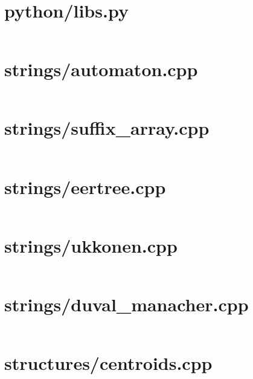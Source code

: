 \newpage
\section{python/libs.py}
\fontsize{7.9}{8.5}\selectfont
\inputminted[numbersep=1pt,linenos,breaklines]{python}{algo/python/libs.py}

\newpage
\section{strings/automaton.cpp}
\fontsize{7.9}{8.5}\selectfont
\inputminted[numbersep=1pt,linenos,breaklines]{c++}{/home/ifsmirnov/olymp/teambook/tmp.qSsNloJNks/tmp.F8erhIFJEZ}

\newpage
\section{strings/suffix\_array.cpp}
\fontsize{7.9}{8.5}\selectfont
\inputminted[numbersep=1pt,linenos,breaklines]{c++}{/home/ifsmirnov/olymp/teambook/tmp.qSsNloJNks/tmp.uMHcWlPNgW}

\newpage
\section{strings/eertree.cpp}
\fontsize{7.9}{8.5}\selectfont
\inputminted[numbersep=1pt,linenos,breaklines]{c++}{/home/ifsmirnov/olymp/teambook/tmp.qSsNloJNks/tmp.ITooi8Z573}

\section{strings/ukkonen.cpp}
\fontsize{7.9}{8.5}\selectfont
\inputminted[numbersep=1pt,linenos,breaklines]{c++}{/home/ifsmirnov/olymp/teambook/tmp.qSsNloJNks/tmp.5u4dfXCpkl}

\newpage
\section{strings/duval\_manacher.cpp}
\fontsize{7.9}{8.5}\selectfont
\inputminted[numbersep=1pt,linenos,breaklines]{c++}{/home/ifsmirnov/olymp/teambook/tmp.qSsNloJNks/tmp.pO8HmHEvVt}

\newpage
\section{structures/centroids.cpp}
\fontsize{7.9}{8.5}\selectfont
\inputminted[numbersep=1pt,linenos,breaklines]{c++}{/home/ifsmirnov/olymp/teambook/tmp.qSsNloJNks/tmp.EL84YLYBKn}

